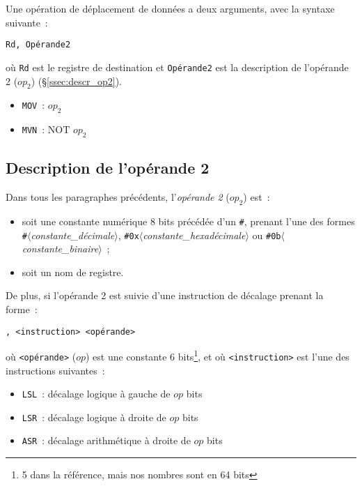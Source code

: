 \documentclass[11pt,a4paper]{article}
\begin{document}
Une opération de déplacement de données a deux arguments, avec la syntaxe suivante~:

\begin{center}\texttt{Rd, Opérande2}\end{center}

où \texttt{Rd} est le registre de destination et \texttt{Opérande2} est la description de l'opérande 2 ($op_2$) (§\ref{ssec:descr_op2}).

\begin{itemize}
\item \texttt{MOV}~: $op_2$
\item \texttt{MVN}~: $\text{NOT } op_2$
\end{itemize}

\subsection*{Description de l'opérande 2}\label{ssec:descr_op2}

Dans tous les paragraphes précédents, l'\emph{opérande 2} ($op_2$) est~:

\begin{itemize}
\item soit une constante numérique 8 bits précédée d'un \texttt{\#}, prenant l'une des formes \texttt{\#}$\langle$\textit{constante\_{}décimale}$\rangle$, \texttt{\#{}0x}$\langle$\textit{constante\_{}hexadécimale}$\rangle$ ou \texttt{\#{}0b}$\langle$\textit{constante\_{}binaire}$\rangle$~;
\item soit un nom de registre.
\end{itemize}

De plus, si l'opérande 2 est suivie d'une instruction de décalage prenant la forme~:

\begin{center}\texttt{, <instruction> <opérande>}\end{center}

où \texttt{<opérande>} ($op$) est une constante 6 bits\footnote{5 dans la référence, mais nos nombres sont en 64 bits}, et où \texttt{<instruction>} est l'une des instructions suivantes~:
\begin{itemize}
\item \texttt{LSL}~: décalage logique à gauche de $op$ bits
\item \texttt{LSR}~: décalage logique à droite de $op$ bits
\item \texttt{ASR}~: décalage arithmétique à droite de $op$ bits
\end{itemize}
\end{document}
